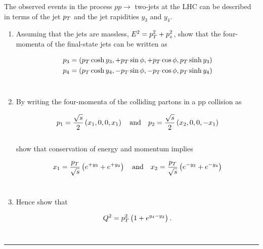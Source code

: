 \begin{problem}{10.6}
The observed events in the process $pp\to$ two-jets at the LHC can be described in terms of the jet $p_T$ and the jet rapidities $y_3$ and $y_4$.

\begin{enumerate}[label=(\alph*)]
    \item Assuming that the jets are massless, $E^2 = p_T^2 + p_z^2 $, show that the four-momenta of the final-state jets can be written as
    
        \begin{align*}
            p_3 &= \left( p_T \cosh y_3,+ p_T \sin \phi ,+ p_T \cos \phi , p_T \sinh y_3  \right) \\
            p_4 &= \left( p_T \cosh y_4,- p_T \sin \phi ,- p_T \cos \phi , p_T \sinh y_4  \right) 
        \end{align*}\\
    \item By writing the four-momenta of the colliding partons in a pp collision as 
    
        \begin{align*}
            p_1 = \frac{\sqrt{s}}{2} \left( x_1,0,0,x_1 \right) \quad \text{and} \quad p_2 = \frac{\sqrt{s}}{2} \left( x_2,0,0,-x_1 \right)
        \end{align*}\\
        show that conservation of energy and momentum implies

        \begin{align*}
            x_1 = \frac{p_T}{\sqrt{s}}\left( e^{+y_3} + e^{+y_4} \right) \quad \text{and} \quad x_2 = \frac{p_T}{\sqrt{s}}\left( e^{-y_3} + e^{-y_4} \right)
        \end{align*}\\
    \item Hence show that
    
        \begin{align*}
            Q^2 = p_T^2 \left( 1 + e^{y_4-y_3} \right).
        \end{align*}\\
\end{enumerate}
\end{problem}
\begin{solution}

\end{solution}

\noindent\rule{7in}{1.5pt}


